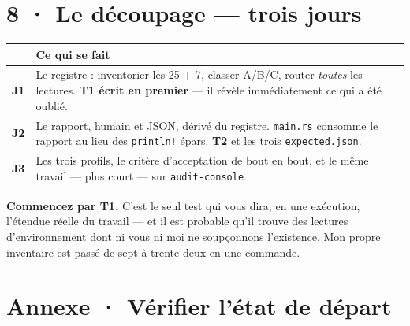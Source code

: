 \documentclass[10pt]{article}
\newcommand{\code}[1]{\texttt{\small #1}}
\begin{document}
\section{8 · Le découpage --- trois jours}

\begin{center}\small
\begin{tabular}{@{}c >{\raggedright\arraybackslash}p{14.4cm}@{}}
\toprule
& \textbf{Ce qui se fait} \\
\midrule
\textbf{J1} & Le registre : inventorier les 25 $+$ 7, classer A/B/C, router \emph{toutes} les lectures. \textbf{T1 écrit en premier} --- il révèle immédiatement ce qui a été oublié. \\
\textbf{J2} & Le rapport, humain et JSON, dérivé du registre. \code{main.rs} consomme le rapport au lieu des \code{println!} épars. \textbf{T2} et les trois \code{expected.json}. \\
\textbf{J3} & Les trois profils, le critère d'acceptation de bout en bout, et le même travail --- plus court --- sur \code{audit-console}. \\
\bottomrule
\end{tabular}
\end{center}

\begin{acquis}
\textbf{Commencez par T1.} C'est le seul test qui vous dira, en une exécution, l'étendue réelle du
travail --- et il est probable qu'il trouve des lectures d'environnement dont ni vous ni moi ne
soupçonnons l'existence. Mon propre inventaire est passé de sept à trente-deux en une commande.
\end{acquis}

\section{Annexe · Vérifier l'état de départ}
\end{document}
